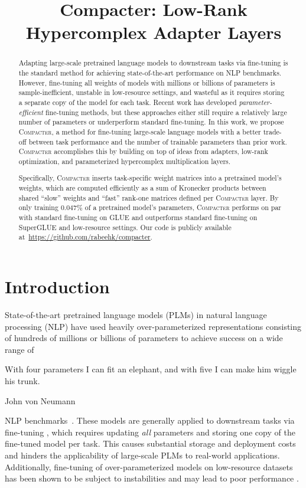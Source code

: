 \title{Compacter: Low-Rank Hypercomplex Adapter Layers}

\begin{abstract}
Adapting large-scale pretrained language models to downstream tasks via fine-tuning is the standard method for achieving state-of-the-art performance on NLP benchmarks. However, fine-tuning all weights of models with millions or billions of parameters is sample-inefficient, unstable in low-resource settings, and wasteful as it requires storing a separate copy of the model for each task. Recent work has developed \emph{parameter-efficient} fine-tuning methods, but these approaches either still require a relatively large number of parameters or underperform standard fine-tuning. In this work, we propose \textsc{Compacter}, a method for fine-tuning large-scale language models with a better trade-off between task performance and the number of trainable parameters than prior work.
\textsc{Compacter} accomplishes this by building on top of ideas from adapters, low-rank optimization, and parameterized hypercomplex multiplication layers.

Specifically, \textsc{Compacter} inserts task-specific weight matrices into a pretrained model's weights, which are computed efficiently as a sum of Kronecker products between shared ``slow'' weights and ``fast'' rank-one matrices defined per \textsc{Compacter} layer. By only training $0.047\%$ of a pretrained model's parameters, \textsc{Compacter} performs on par with standard fine-tuning on GLUE and outperforms standard fine-tuning on SuperGLUE and low-resource settings. Our code is publicly available at~\url{https://github.com/rabeehk/compacter}.
\end{abstract}

\section{Introduction}

\parbox[b]{0.5\textwidth}{
State-of-the-art pretrained language models (PLMs) in natural language processing (NLP) have used heavily over-parameterized representations consisting of hundreds of millions or billions of parameters to achieve success on a wide range of \linebreak ~ }
\parbox[b]{0.45\textwidth}{
  \epigraph{With four parameters I can fit an elephant, and with five I can make him wiggle his trunk.}{John von Neumann} } NLP benchmarks~\citep{devlin2019bert, raffel2019exploring, liu2019roberta}. These models are generally applied to downstream tasks via fine-tuning \citep{howard-2018-ulmfit}, which requires updating \emph{all} parameters and storing one copy of the fine-tuned model per task. This causes substantial storage and deployment costs and hinders the applicability of large-scale PLMs to real-world applications. Additionally, fine-tuning of over-parameterized models on low-resource datasets has been shown to be subject to instabilities and may lead to poor performance \citep{peters-2019-tune,Dodge2020fine-tuning}.

